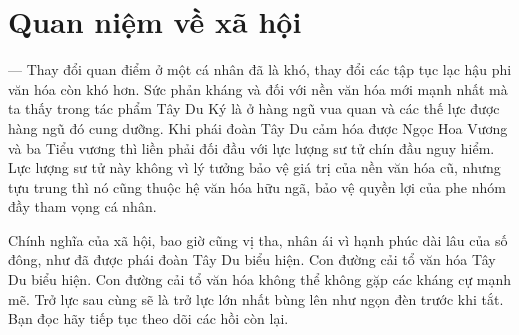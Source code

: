 \section{Quan niệm về xã hội} %
\label{sec:88_89_90_xa_hoi}

— Thay đổi quan điểm ở một cá nhân đã là khó, thay đổi các tập tục lạc hậu phi văn hóa còn khó hơn. Sức phản kháng và đối với nền văn hóa mới mạnh nhất mà ta thấy trong tác phẩm Tây Du Ký là ở hàng ngũ vua quan và các thế lực được hàng ngũ đó cung dưỡng. Khi phái đoàn Tây Du cảm hóa được Ngọc Hoa Vương và ba Tiểu vương thì liền phải đối đầu với lực lượng sư tử chín đầu nguy hiểm. Lực lượng sư tử này không vì lý tưởng bảo vệ giá trị của nền văn hóa cũ, nhưng tựu trung thì nó cũng thuộc hệ văn hóa hữu ngã, bảo vệ quyền lợi của phe nhóm đầy tham vọng cá nhân.

Chính nghĩa của xã hội, bao giờ cũng vị tha, nhân ái vì hạnh phúc dài lâu của số đông, như đã được phái đoàn Tây Du biểu hiện. Con đường cải tổ văn hóa Tây Du biểu hiện. Con đường cải tổ văn hóa không thể không gặp các kháng cự mạnh mẽ. Trở lực sau cùng sẽ là trở lực lớn nhất bùng lên như ngọn đèn trước khi tắt. Bạn đọc hãy tiếp tục theo dõi các hồi còn lại.
